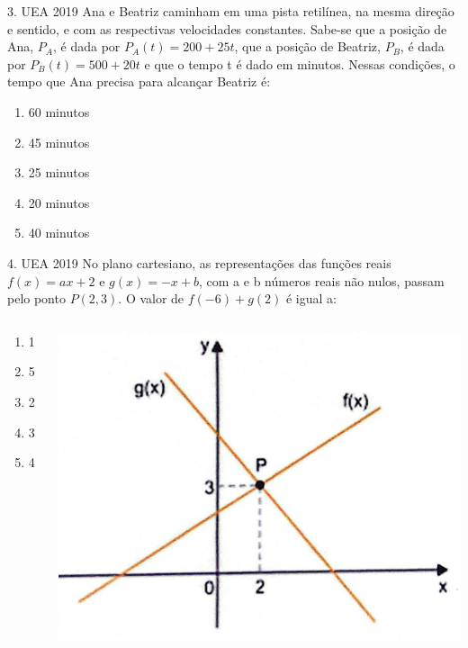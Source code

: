\documentclass[11pt]{beamer}
\begin{document}
\begin{frame}{3. UEA 2019}
    Ana e Beatriz caminham em uma pista retilínea, na mesma direção e sentido, e com as respectivas velocidades constantes. Sabe-se que a posição de Ana, $P_{A}$, é dada por $P_{A}(t) = 200 + 25t$, que a posição de Beatriz, $P_{B}$, é dada por $P_{B}(t) = 500 + 20t$ e que o tempo t é dado em minutos. Nessas condições, o tempo que Ana precisa para alcançar Beatriz é:

    \begin{enumerate}[a]
        \item 60 minutos %
        \item 45 minutos
        \item 25 minutos
        \item 20 minutos 
        \item 40 minutos
    \end{enumerate}
\end{frame}

\begin{frame}{4. UEA 2019}
    No plano cartesiano, as representações das funções reais $f(x)=ax+2$ e $g(x)=-x+b$, com a e b números reais não nulos, passam pelo ponto $P(2,3)$. O valor de $f(-6)+g(2)$ é igual a:

    \begin{columns}
        \begin{column}{0.4\textwidth}
            \begin{enumerate}[a]
                \item 1
                \item 5
                \item 2 %
                \item 3
                \item 4
            \end{enumerate}
        \end{column}

        \begin{column}{0.6\textwidth}
            \centering
            \includegraphics[scale=0.4]{imagens/q2.png}
        \end{column}
    \end{columns}

\end{frame}
\end{document}
